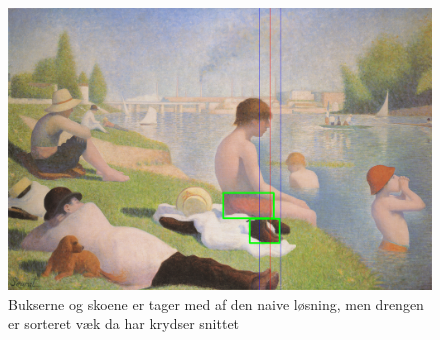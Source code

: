 \begin{figure}[h!!]
	\begin{center}
		\includegraphics[scale=0.3,angle=0]{afsnit/afprovning/billeder/naive_losning/naiv_mfarver_mdetaljer.png}
	\end{center}
	\caption[]{Bukserne og skoene er tager med af den naive løsning, men
	drengen er sorteret væk da har krydser snittet}
	\label{naiv_mfarver_mdetaljer}
\end{figure}

